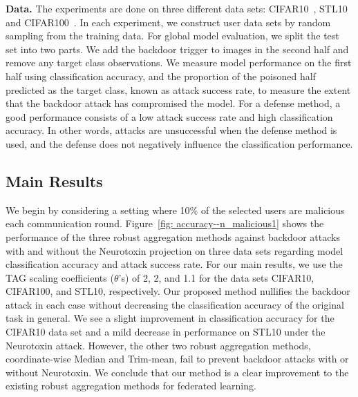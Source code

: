 \documentclass{article} %
\begin{document}
\textbf{Data.} The experiments are done on three different data sets: CIFAR10~\citep{krizhevsky2009learning}, STL10~\citep{coates2011analysis} and CIFAR100~\citep{krizhevsky2009learning}. In each experiment, we construct user data sets by random sampling from the training data. For global model evaluation, we split the test set into two parts. We add the backdoor trigger to images in the second half and remove any target class observations. We measure model performance on the first half using {\color{blue}classification accuracy}, and the proportion of the poisoned half predicted as the target class, known as {\color{red}attack success rate}, to measure the extent that the backdoor attack has compromised the model. For a defense method, a good performance consists of a low attack success rate and high classification accuracy. In other words, attacks are unsuccessful when the defense method is used, and the defense does not negatively influence the classification performance. 


\subsection{Main Results}

We begin by considering a setting where 10\% of the selected users are malicious each communication round. Figure~\ref{fig: accuracy--n_malicious1} shows the performance of the three robust aggregation methods against backdoor attacks with and without the Neurotoxin projection on three data sets regarding model classification accuracy and attack success rate. For our main results, we use the TAG scaling coefficients ($\theta$'s) of 2, 2, and 1.1 for the data sets CIFAR10, CIFAR100, and STL10, respectively. Our proposed method nullifies the backdoor attack in each case without decreasing the classification accuracy of the original task in general. We see a slight improvement in classification accuracy for the CIFAR10 data set and a mild decrease in performance on STL10 under the Neurotoxin attack. However, the other two robust aggregation methods, coordinate-wise Median and Trim-mean, fail to prevent backdoor attacks with or without Neurotoxin. We conclude that our method is a clear improvement to the existing robust aggregation methods for federated learning. 
\end{document}
